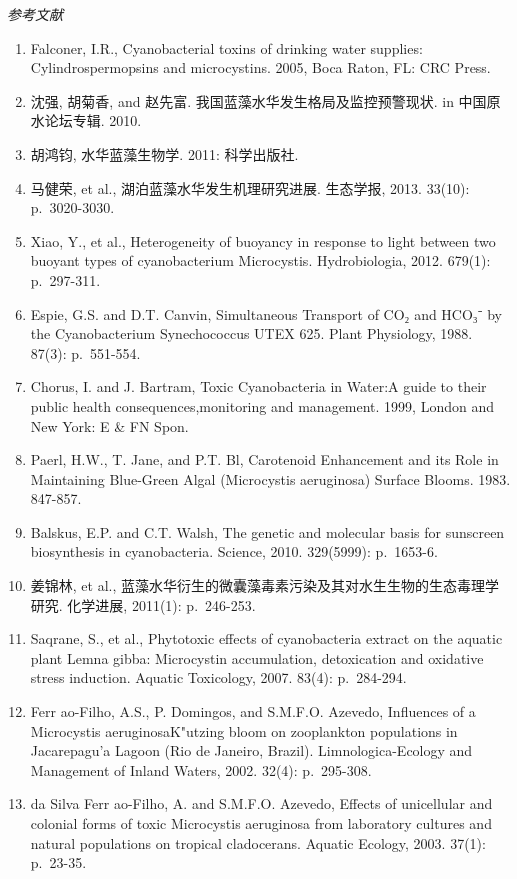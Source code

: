 \documentclass[]{book}
\begin{document}
\emph{参考文献}

\begin{enumerate}
\def\labelenumi{\arabic{enumi}.}
\item
  Falconer, I.R., Cyanobacterial toxins of drinking water supplies: Cylindrospermopsins and microcystins. 2005, Boca Raton, FL: CRC Press.
\item
  沈强, 胡菊香, and 赵先富. 我国蓝藻水华发生格局及监控预警现状. in 中国原水论坛专辑. 2010.
\item
  胡鸿钧, 水华蓝藻生物学. 2011: 科学出版社.
\item
  马健荣, et al., 湖泊蓝藻水华发生机理研究进展. 生态学报, 2013. 33(10): p.~3020-3030.
\item
  Xiao, Y., et al., Heterogeneity of buoyancy in response to light between two buoyant types of cyanobacterium Microcystis. Hydrobiologia, 2012. 679(1): p.~297-311.
\item
  Espie, G.S. and D.T. Canvin, Simultaneous Transport of CO₂ and HCO₃⁻ by the Cyanobacterium Synechococcus UTEX 625. Plant Physiology, 1988. 87(3): p.~551-554.
\item
  Chorus, I. and J. Bartram, Toxic Cyanobacteria in Water:A guide to their public health consequences,monitoring and management. 1999, London and New York: E \& FN Spon.
\item
  Paerl, H.W., T. Jane, and P.T. Bl, Carotenoid Enhancement and its Role in Maintaining Blue-Green Algal (Microcystis aeruginosa) Surface Blooms. 1983. 847-857.
\item
  Balskus, E.P. and C.T. Walsh, The genetic and molecular basis for sunscreen biosynthesis in cyanobacteria. Science, 2010. 329(5999): p.~1653-6.
\item
  姜锦林, et al., 蓝藻水华衍生的微囊藻毒素污染及其对水生生物的生态毒理学研究. 化学进展, 2011(1): p.~246-253.
\item
  Saqrane, S., et al., Phytotoxic effects of cyanobacteria extract on the aquatic plant Lemna gibba: Microcystin accumulation, detoxication and oxidative stress induction. Aquatic Toxicology, 2007. 83(4): p.~284-294.
\item
  Ferr ao-Filho, A.S., P. Domingos, and S.M.F.O. Azevedo, Influences of a Microcystis aeruginosaK"utzing bloom on zooplankton populations in Jacarepagu'a Lagoon (Rio de Janeiro, Brazil). Limnologica-Ecology and Management of Inland Waters, 2002. 32(4): p.~295-308.
\item
  da Silva Ferr ao-Filho, A. and S.M.F.O. Azevedo, Effects of unicellular and colonial forms of toxic Microcystis aeruginosa from laboratory cultures and natural populations on tropical cladocerans. Aquatic Ecology, 2003. 37(1): p.~23-35.

\end{enumerate}
\end{document}

